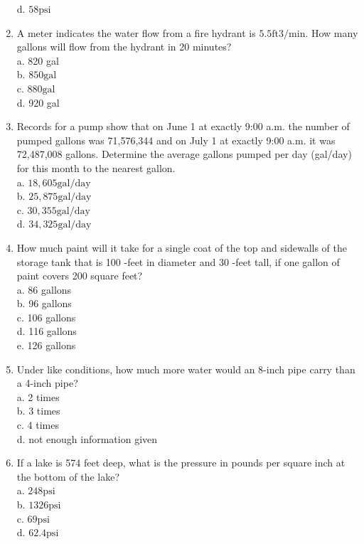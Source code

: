 \begin{enumerate}
d. $58 \mathrm{psi}$\\
\item A meter indicates the water flow from a fire hydrant is $5.5 \mathrm{ft} 3 / \mathrm{min}$. How many gallons will flow from the hydrant in 20 minutes?\\
a. 820 gal\\
b. $850 \mathrm{gal}$\\
c. $880 \mathrm{gal}$\\
d. 920 gal\\
\item Records for a pump show that on June 1 at exactly 9:00 a.m. the number of pumped gallons was 71,576,344 and on July 1 at exactly 9:00 a.m. it was 72,487,008 gallons. Determine the average gallons pumped per day (gal/day) for this month to the nearest gallon.\\
a. $18,605 \mathrm{gal} / \mathrm{day}$\\
b. $25,875 \mathrm{gal} / \mathrm{day}$\\
c. $30,355 \mathrm{gal} / \mathrm{day}$\\
d. $34,325 \mathrm{gal} / \mathrm{day}$\\
\item How much paint will it take for a single coat of the top and sidewalls of the storage tank that is 100 -feet in diameter and 30 -feet tall, if one gallon of paint covers 200 square feet?\\
a. 86 gallons\\
b. 96 gallons\\
c. 106 gallons\\
d. 116 gallons\\
e. 126 gallons\\
\item Under like conditions, how much more water would an 8-inch pipe carry than a 4-inch pipe?\\
a. 2 times\\
b. 3 times\\
c. 4 times\\
d. not enough information given\\
\item If a lake is 574 feet deep, what is the pressure in pounds per square inch at the bottom of the lake?\\
a. $248 \mathrm{psi}$\\
b. $1326 \mathrm{psi}$\\
c. $69 \mathrm{psi}$\\
d. $62.4 \mathrm{psi}$\\

\end{enumerate}
